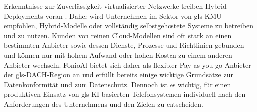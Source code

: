 Erkenntnisse zur Zuverlässigkeit virtualisierter Netzwerke treiben Hybrid-Deployments voran \parencite{Antonova2025} \parencite{ReliabilityVirtualizedNetworks}. Daher wird Unternehmen im Sektor von \gls{gls-KMU} empfohlen, Hybrid-Modelle oder vollständig selbstgehostete Systeme zu betreiben und zu nutzen. Kunden von reinen Cloud-Modellen sind oft stark an einen bestimmten Anbieter sowie dessen Dienste, Prozesse und Richtlinien gebunden und können nur mit hohem Aufwand oder hohen Kosten zu einem anderen Anbieter wechseln. FonioAI bietet sich daher als flexibler Pay-as-you-go-Anbieter der \gls{gls-DACH}-Region an und erfüllt bereits einige wichtige Grundsätze zur Datenkonformität und zum Datenschutz. Dennoch ist es wichtig, für einen produktiven Einsatz von \gls{gls-KI}-basierten Telefonsystemen individuell nach den Anforderungen des Unternehmens und den Zielen zu entscheiden.

